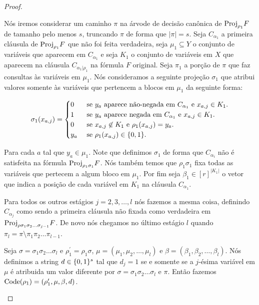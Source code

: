 \begin{proof}
\begin{enumerate}
	Nós iremos considerar um caminho $\pi$ na árvode de decisão canônica de $\text{Proj}_{\rho_{1}}F$ de tamanho pelo menos $s$, truncando $\pi$ de forma que $\lvert \pi \rvert = s$. Seja $C_{\alpha_{1}}$ a primeira cláusula de $\text{Proj}_{\rho_{1}}F$ que não foi feita verdadeira, seja $\mu_{1} \subseteq Y$ o conjunto de variáveis que aparecem em $C_{\alpha_{1}}$ e seja $K_{1}$ o conjunto de variáveis em $X$ que aparecem na cláusula $C_{\alpha_{1} \lvert \rho_{1}}$ na fórmula $F$ original. Seja $\pi_{1}$ a porção de $\pi$ que faz consultas às variáveis em $\mu_{1}$. Nós consideramos a seguinte projeção $\sigma_{1}$ que atribui valores somente às variáveis que pertencem a blocos em $\mu_{1}$ da seguinte forma:
	
	\begin{equation} \label{sigma_i_def}
		\sigma_{1}(x_{a, j}) = \begin{cases}
					      	0 & \text{ se } y_{a} \text{ aparece não-negada em } C_{\alpha_{1}} \text{ e } x_{a, j} \in K_{1}. \\
					      	1 & \text{ se } y_{a} \text{ aparece negada em } C_{\alpha_{1}} \text{ e } x_{a, j} \in K_{1}. \\
					      	0 & \text{ se } x_{a, j} \not\in K_{1} \text{ e } \rho_{1}(x_{a, j}) = y_{a}. \\
					      	y_{a} & \text{ se } \rho_{1}(x_{a, j}) \in \{0, 1\}.
					      \end{cases}
	\end{equation}
	
	Para cada $a$ tal que $y_{a} \in \mu_{1}$. Note que definimos $\sigma_{1}$ de forma que $C_{\alpha_{i}}$ não é satisfeita na fórmula $\text{Proj}_{\rho_{1}\sigma_{1}}F$. Nós também temos que $\rho_{1}\sigma_{1}$ fixa todas as variáveis que pertecem a algum bloco em $\mu_{1}$. Por fim seja $\beta_{1} \in [r]^{\lvert K_{1} \rvert}$ o vetor que indica a posição de cada variável em $K_{1}$ na cláusula $C_{\alpha_{1}}$.
	
	Para todos os outros estágios $j = 2, 3, \dots, l$ nós fazemos a mesma coisa, definindo $C_{\alpha_{j}}$ como sendo a primeira cláusula não fixada como verdadeira em $\text{Proj}_{\rho\sigma_{1}\sigma_{2}\dots\sigma_{j - 1}}F$. De novo nós chegamos no último estágio $l$ quando $\pi_{l} = \pi \setminus \pi_{1}\pi_{2}\dots\pi_{l - 1}$.
	
	Seja $\sigma = \sigma_{1}\sigma_{2}\dots\sigma_{l}$ e $\rho_{1}^{\prime} = \rho_{1}\sigma$, $\mu = (\mu_{1}, \mu_{2}, \dots, \mu_{l})$ e $\beta = (\beta_{1}, \beta_{2}, \dots, \beta_{l})$. Nós definimos a string $d \in \{0, 1\}^{s}$ tal que $d_{j} = 1$ se e somente se a $j$-ésima variável em $\mu$ é atribuida um valor diferente por $\sigma = \sigma_{1}\sigma_{2}\dots\sigma_{l}$ e $\pi$. Então fazemos $\text{Code}(\rho_{1}) = (\rho_{1}^{\prime}, \mu, \beta, d)$.
	

\end{enumerate}
\end{proof}
